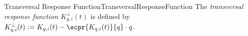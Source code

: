 \begin{mdef}{Transversal Response Function}{TransversalResponseFunction}
    The \emph{transversal response function} $K_{q,i}^\perp(t)$ is defined by $K_{q,i}^\perp(t) := K_{q,i}(t) - \scpr{K_{q,i}(t)}{q}\cdot q$.
\end{mdef}